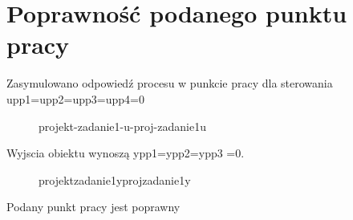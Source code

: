 \section{Poprawność podanego punktu pracy}
\label{projekt:zad1}

Zasymulowano	odpowiedź	procesu	w	punkcie	pracy	dla	sterowania	
upp1=upp2=upp3=upp4=0	

\begin{figure}[H] 
   \centering
   
   \caption{projekt-zadanie1-u-proj-zadanie1u}
   \label{projekt:zad1:figure:proj_zadanie1u}
\end{figure}

Wyjscia obiektu	wynoszą	ypp1=ypp2=ypp3	=0.

\begin{figure}[H] 
   \centering
   
   \caption{projektzadanie1yprojzadanie1y}
   \label{projekt:zad1:figure:proj_zadanie1y}
\end{figure}

Podany	punkt	pracy	jest	poprawny

\newpage

